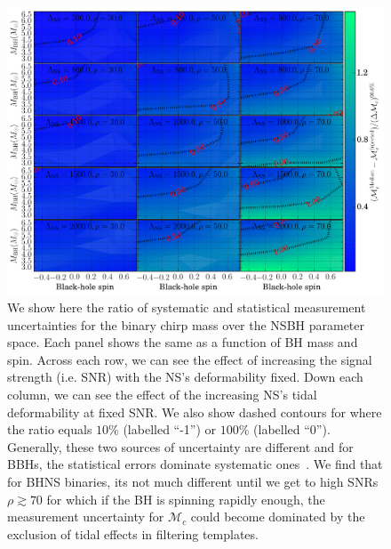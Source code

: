 \documentclass[aps,prd,amsmath,floats,floatfix, twocolumn,
superscriptaddress,nofootinbib,showpacs]{revtex4-1}
\newcommand{\mchirp}{\mathcal{M}_c}
\begin{document}
\begin{figure}
\centering 
\includegraphics[width=1.8\columnwidth]{plots/TNMchirpBiasesOverCIWidths_CI90_0_Lambda_SNR30_70_linear}
\caption{We show here the ratio of systematic and statistical
measurement uncertainties for the binary chirp mass over the NSBH parameter 
space. Each panel shows the same as a function of BH mass and spin. Across
each row, we can see the effect of increasing the signal strength (i.e. SNR)
with the NS's deformability fixed. Down each column, we can see 
the effect of the increasing NS's tidal deformability at fixed SNR. We also
show dashed contours for where the ratio equals $10\%$ (labelled ``-1'')
or $100\%$ (labelled ``0'').
% 
Generally, these two sources of uncertainty are different and for BBHs, the
statistical errors dominate systematic ones~\cite{Kumar:2016dhh}. We find
that for BHNS binaries, its not much different until we get to high SNRs
$\rho\gtrsim 70$ for which if the BH is spinning rapidly enough, the 
measurement uncertainty for $\mchirp$ could become dominated by the exclusion
of tidal effects in filtering templates.
}
\label{fig:TN_chirpMassBias_vs_Lambda_SNR}
\end{figure}
%
\end{document}

